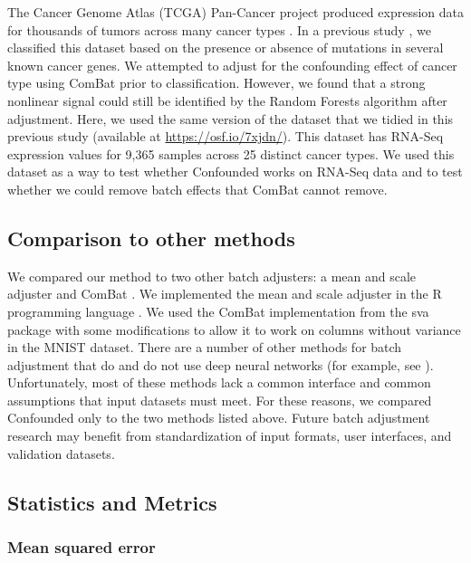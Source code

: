 \documentclass[notitlepage]{article}
\begin{document}
The Cancer Genome Atlas (TCGA) Pan-Cancer project produced expression data for thousands of tumors across many cancer types \cite{the_cancer_genome_atlas_research_network_cancer_2013}.
In a previous study \cite{dayton_classifying_2017-1}, we classified this dataset based on the presence or absence of mutations in several known cancer genes.
We attempted to adjust for the confounding effect of cancer type using ComBat prior to classification.
However, we found that a strong nonlinear signal could still be identified by the Random Forests algorithm after adjustment.
Here, we used the same version of the dataset that we tidied in this previous study (available at \url{https://osf.io/7xjdn/}).
This dataset has RNA-Seq expression values for 9,365 samples across 25 distinct cancer types.
We used this dataset as a way to test whether Confounded works on RNA-Seq data and to test whether we could remove batch effects that ComBat cannot remove.

\subsection{Comparison to other methods}

We compared our method to two other batch adjusters: a mean and scale adjuster and ComBat \cite{johnson_adjusting_2007}.
We implemented the mean and scale adjuster in the R programming language \cite{r_core_team_r_2014}.
We used the ComBat implementation from the sva package \cite{leek_sva_2017} with some modifications to allow it to work on columns without variance in the MNIST dataset.
There are a number of other methods for batch adjustment that do and do not use deep neural networks (for example, see \cite{leek_capturing_2007,espin-perez_comparison_2018,shaham_removal_2017,shaham_batch_2018}). %
Unfortunately, most of these methods lack a common interface and common assumptions that input datasets must meet.
For these reasons, we compared Confounded only to the two methods listed above.
Future batch adjustment research may benefit from standardization of input formats, user interfaces, and validation datasets.

\subsection{Statistics and Metrics}

\subsubsection{Mean squared error}
\end{document}
